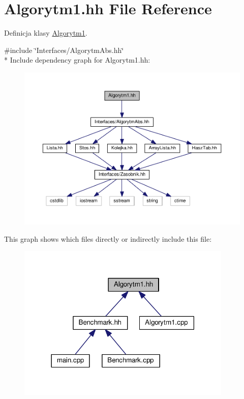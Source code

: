 \hypertarget{a00019}{}\section{Algorytm1.\+hh File Reference}
\label{a00019}


Definicja klasy \hyperlink{a00002}{Algorytm1}.  


{\ttfamily \#include \char`\"{}Interfaces/\+Algorytm\+Abs.\+hh\char`\"{}}\\*
Include dependency graph for Algorytm1.\+hh\+:
\nopagebreak
\begin{figure}[H]
\begin{center}
\leavevmode
\includegraphics[width=350pt]{a00054}
\end{center}
\end{figure}
This graph shows which files directly or indirectly include this file\+:
\nopagebreak
\begin{figure}[H]
\begin{center}
\leavevmode
\includegraphics[width=290pt]{a00055}
\end{center}
\end{figure}
